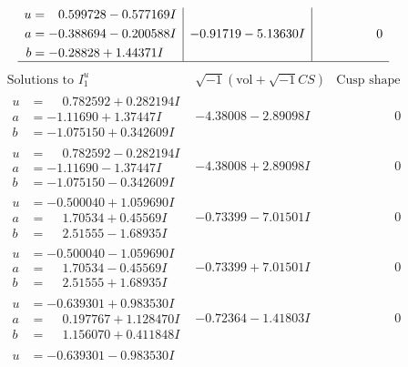 \documentclass[1p]{elsarticle_modified}
\theoremstyle{definition}
\newcommand{\I}{\sqrt{-1}}
\begin{document}
$$\begin{array}{c|c|c}
\begin{aligned}
u &= \phantom{-}0.599728 - 0.577169 I \\
a &= -0.388694 - 0.200588 I \\
b &= -0.28828 + 1.44371 I\end{aligned}
 & -0.91719 - 5.13630 I & \phantom{-0.000000 } 0\\
 \hline 
 \end{array}$$\newpage$$\begin{array}{c|c|c}  
\text{Solutions to }I^u_{1}& \I (\text{vol} + \sqrt{-1}CS) & \text{Cusp shape}\\
 \hline 
\begin{aligned}
u &= \phantom{-}0.782592 + 0.282194 I \\
a &= -1.11690 + 1.37447 I \\
b &= -1.075150 + 0.342609 I\end{aligned}
 & -4.38008 - 2.89098 I & \phantom{-0.000000 } 0 \\ \hline\begin{aligned}
u &= \phantom{-}0.782592 - 0.282194 I \\
a &= -1.11690 - 1.37447 I \\
b &= -1.075150 - 0.342609 I\end{aligned}
 & -4.38008 + 2.89098 I & \phantom{-0.000000 } 0 \\ \hline\begin{aligned}
u &= -0.500040 + 1.059690 I \\
a &= \phantom{-}1.70534 + 0.45569 I \\
b &= \phantom{-}2.51555 - 1.68935 I\end{aligned}
 & -0.73399 - 7.01501 I & \phantom{-0.000000 } 0 \\ \hline\begin{aligned}
u &= -0.500040 - 1.059690 I \\
a &= \phantom{-}1.70534 - 0.45569 I \\
b &= \phantom{-}2.51555 + 1.68935 I\end{aligned}
 & -0.73399 + 7.01501 I & \phantom{-0.000000 } 0 \\ \hline\begin{aligned}
u &= -0.639301 + 0.983530 I \\
a &= \phantom{-}0.197767 + 1.128470 I \\
b &= \phantom{-}1.156070 + 0.411848 I\end{aligned}
 & -0.72364 - 1.41803 I & \phantom{-0.000000 } 0 \\ \hline\begin{aligned}
u &= -0.639301 - 0.983530 I \\

\end{aligned}
\end{array}$$
\end{document}
